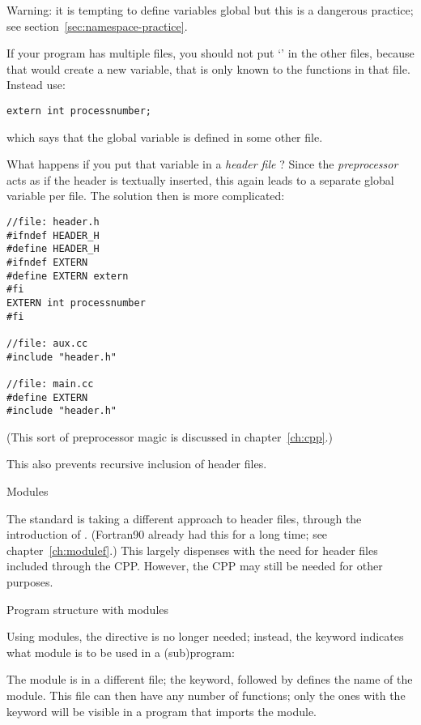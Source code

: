 Warning: it is tempting to define variables global but this is a
dangerous practice; see section~\ref{sec:namespace-practice}.

If your program has multiple files, you should not put `'
in the other files, because that would create a new variable, that is
only known to the functions in that file. Instead use:
\begin{lstlisting}
extern int processnumber;
\end{lstlisting}
which says that the global variable  is defined in
some other file.

What happens if you put that variable in a
%
\emph{header file}%
%
? Since the
%
\emph{preprocessor}%
acts as if the header is textually inserted, this again leads to
a separate global variable per file. The solution then is more
complicated:
\begin{lstlisting}
//file: header.h
#ifndef HEADER_H
#define HEADER_H
#ifndef EXTERN
#define EXTERN extern
#fi
EXTERN int processnumber
#fi

//file: aux.cc
#include "header.h"

//file: main.cc
#define EXTERN
#include "header.h"
\end{lstlisting}
(This sort of preprocessor magic is discussed in chapter~\ref{ch:cpp}.)

This also prevents recursive inclusion of header files.

 {Modules}

The  standard is taking a different approach
to header files, through the introduction of .
(Fortran90 already had this for a long time; see chapter~\ref{ch:modulef}.)
This largely dispenses with the need for
header files included through the \ac{CPP}.
However, the \ac{CPP} may still be needed for other purposes.

 {Program structure with modules}

Using modules, the  directive is no longer needed;
instead, the  keyword indicates what module is to be used
in a (sub)program:
%

The module is in a different file; the
 keyword,
followed by  defines the name of the module.
This file can then have any number of functions;
only the ones with the  keyword will be
visible in a program that imports the module.
%

